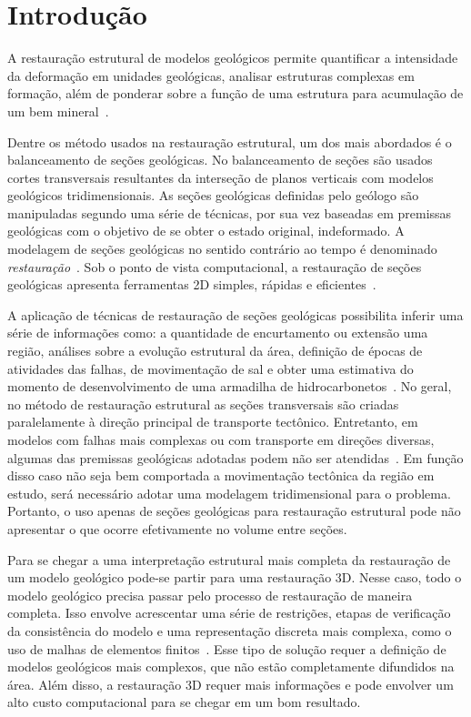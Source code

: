 
\chapter{Introdução}

A restauração estrutural de modelos geológicos permite quantificar a intensidade da deformação em unidades geológicas, analisar estruturas complexas em formação, além de ponderar sobre a função de uma estrutura para acumulação de um bem mineral~\cite{GarciaTese}.

Dentre os método usados na restauração estrutural, um dos mais abordados é o balanceamento de seções geológicas. No balanceamento de seções são usados cortes transversais resultantes da interseção de planos verticais com modelos geológicos tridimensionais. As seções geológicas definidas pelo geólogo são manipuladas segundo uma série de técnicas, por sua vez baseadas em premissas geológicas com o objetivo de se obter o estado original, indeformado. A modelagem de seções geológicas no sentido contrário ao tempo é denominado \emph{restauração}~\cite{Fossen}. Sob o ponto de vista computacional, a restauração de seções geológicas apresenta ferramentas 2D simples, rápidas e eficientes~\cite{GarciaTese}.

A aplicação de técnicas de restauração de seções geológicas possibilita inferir uma série de informações como: a quantidade de encurtamento ou extensão uma região, análises sobre a evolução estrutural da área, definição de épocas de atividades das falhas, de movimentação de sal e obter uma estimativa do momento de desenvolvimento de uma armadilha de hidrocarbonetos~\cite{DURANDRIARD-3D, Guedes}. No geral, no método de restauração estrutural as seções transversais são criadas paralelamente à direção principal de transporte tectônico. Entretanto, em modelos com falhas mais complexas ou com transporte em direções diversas, algumas das premissas geológicas adotadas podem não ser atendidas~\cite{GarciaTese}. Em função disso caso não seja bem comportada a movimentação tectônica da região em estudo, será necessário adotar uma modelagem tridimensional para o problema. Portanto, o uso apenas de seções geológicas para restauração estrutural pode não apresentar o que ocorre efetivamente no volume entre seções.

Para se chegar a uma interpretação estrutural mais completa da restauração de um modelo geológico pode-se partir para uma restauração 3D. Nesse caso, todo o modelo geológico precisa passar pelo processo de restauração de maneira completa. Isso envolve acrescentar uma série de restrições, etapas de verificação da consistência do modelo e uma representação discreta mais complexa, como o uso de malhas de elementos finitos~\cite{DURANDRIARD2010441}. Esse tipo de solução requer a definição de modelos geológicos mais complexos, que não estão completamente difundidos na área. Além disso, a restauração 3D requer mais informações e pode envolver um alto custo computacional para se chegar em um bom resultado.

